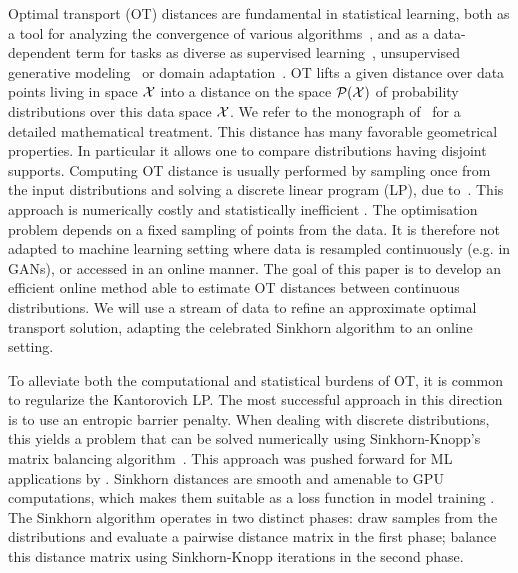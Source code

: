 
Optimal transport (OT) distances are fundamental in statistical learning, both
as a tool for analyzing the convergence of various
algorithms~\citep{canas2012learning,dalalyan2019user}, and as a data-dependent
term for tasks as diverse as supervised learning~\citep{frogner2015learning},
unsupervised generative modeling~\citep{arjovsky2017wgan} or domain
adaptation~\citep{courty2016optimal}.
%
OT lifts a given distance over data points living in space $\mathcal{X}$ into a distance
on the space $\mathcal{P}(\mathcal{X})$ of probability distributions over this data space $\mathcal{X}$. We refer to the monograph of~\citet{santambrogio2015optimal} for a detailed mathematical treatment.
%
This distance has many favorable geometrical properties. In particular it allows one to compare distributions having disjoint supports. 
% 
Computing OT distance is usually performed by sampling once from the input
distributions and solving a discrete linear program (LP), due
to~\citet{Kantorovich42}. This approach is numerically costly and statistically
inefficient \citep{weed2019sharp}. The optimisation problem depends on a fixed
sampling of points from the data. It is therefore not adapted to machine
learning setting where data is resampled continuously (e.g. in GANs), or
accessed in an online manner. The goal of this paper is to develop an efficient
online method able to estimate OT distances between continuous distributions. We
will use a stream of data to refine an approximate optimal transport solution,
adapting the celebrated Sinkhorn algorithm to an online setting.
  


To alleviate both the computational and statistical burdens of OT, it is common
to regularize the Kantorovich LP.
%
The most successful approach in this direction is to use an entropic barrier penalty. 
%
When dealing with discrete distributions, this yields a problem that can be solved
numerically using Sinkhorn-Knopp's matrix balancing
algorithm~\citep{Sinkhorn64,sinkhorn1967concerning}.
%
This approach was pushed forward for ML applications by
\citet{cuturi2013sinkhorn}. Sinkhorn distances are smooth and amenable to GPU
computations, which makes them suitable as a loss function in model training \citep{frogner2015learning, mensch_geometric_2019}.
The Sinkhorn algorithm operates in two distinct phases: draw samples from the
distributions and evaluate a pairwise distance matrix in the first phase;
balance this distance matrix using Sinkhorn-Knopp iterations in the second
phase.

